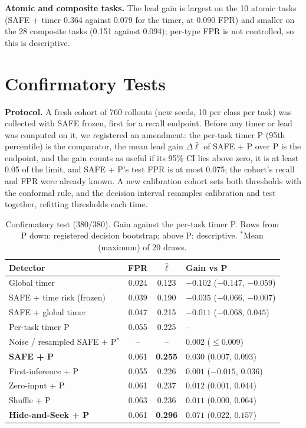 \documentclass[10pt,a4paper,twocolumn]{article}
\begin{document}
\textbf{Atomic and composite tasks.} The lead gain is largest on the 10 atomic tasks (SAFE +
timer 0.364 against 0.079 for the timer, at 0.090 FPR) and smaller on the 28 composite tasks
(0.151 against 0.094); per-type FPR is not controlled, so this is descriptive.

\section{Confirmatory Tests}
\label{sec:confirm}

\textbf{Protocol.} A fresh cohort of 760 rollouts (new seeds, 10 per class per task) was
collected with SAFE frozen, first for a recall endpoint. Before any timer or lead was
computed on it, we registered an amendment: the per-task timer P (95th percentile) is the
comparator, the mean lead gain $\Delta\bar\ell$ of SAFE + P over P is the endpoint, and the
gain counts as useful if its 95\% CI lies above zero, it is at least 0.05 of the limit, and
SAFE + P's test FPR is at most 0.075; the cohort's recall and FPR were already known. A new
calibration cohort sets both thresholds with the conformal rule, and the decision interval
resamples calibration and test together, refitting thresholds each time.

\begin{table}[t]
\centering
\caption{Confirmatory test (380/380). Gain against the per-task timer P. Rows from P down:
registered decision bootstrap; above P: descriptive. $^\ast$Mean (maximum) of 20 draws.}
\label{tab:confirm}
\footnotesize
\setlength{\tabcolsep}{3pt}
\begin{tabular}{@{}lccl@{}}
\toprule
Detector & FPR & $\bar\ell$ & Gain vs P \\
\midrule
Global timer & 0.024 & 0.123 & $-0.102$ ($-0.147$, $-0.059$) \\
SAFE + time risk (frozen) & 0.039 & 0.190 & $-0.035$ ($-0.066$, $-0.007$) \\
SAFE + global timer & 0.047 & 0.215 & $-0.011$ ($-0.068$, $0.045$) \\
Per-task timer P & 0.055 & 0.225 & -- \\
Noise / resampled SAFE + P$^\ast$ & -- & -- & $0.002$ ($\le 0.009$) \\
\textbf{SAFE + P} & 0.061 & \textbf{0.255} & $\mathbf{0.030}$ ($0.007$, $0.093$) \\
First-inference + P & 0.055 & 0.226 & $0.001$ ($-0.015$, $0.036$) \\
Zero-input + P & 0.061 & 0.237 & $0.012$ ($0.001$, $0.044$) \\
Shuffle + P & 0.063 & 0.236 & $0.011$ ($0.000$, $0.064$) \\
\textbf{Hide-and-Seek + P} & 0.061 & \textbf{0.296} & $\mathbf{0.071}$ ($0.022$, $0.157$) \\
\bottomrule
\end{tabular}
\end{table}
\end{document}
